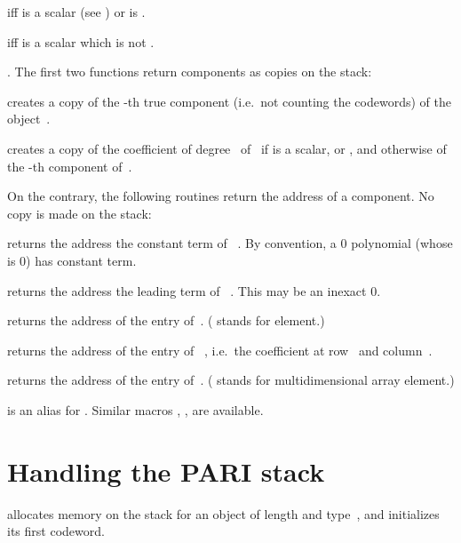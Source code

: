   iff  is a scalar (see
) or  is .

  iff  is a scalar which is not
.

.\label{se:accessors}
The first two functions return  components as copies on the stack:

 creates a copy of the -th true
component (i.e.\ not counting the codewords) of the object~.

 creates a copy of the coefficient of
degree~ of~ if  is a scalar,  or ,
and otherwise of the -th component of~.
\smallskip

\noindent On the contrary, the following routines return the address of a
 component. No copy is made on the stack:

 returns the address the constant term of
~. By convention, a $0$ polynomial (whose  is $0$)
has  constant term.

 returns the address the leading term of
~. This may be an inexact $0$.

 returns the address of the
 entry of~. ( stands for element.)

 returns the address of the
 entry of ~, i.e.~the coefficient at row~
and column~.

 returns the address of the
 entry of~. ( stands for multidimensional array
element.)

 is an alias for .
Similar macros , ,  are available.

\section{Handling the PARI stack}


 allocates memory on the stack for
an object of length  and type~, and initializes its first
codeword.

